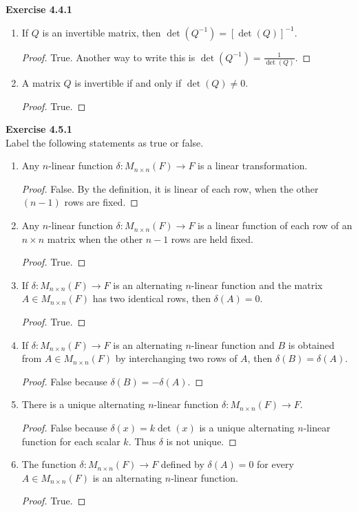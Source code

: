 \documentclass[12pt, a4paper]{article}
\theoremstyle{plain}
\newenvironment{exercise}[2][Exercise]
    { \begin{mdframed}[backgroundcolor=gray!20] \textbf{#1 #2} \\}
    {  \end{mdframed}}
\begin{document}
\begin{exercise}{4.4.1}
\begin{enumerate}[label=(\alph*)]
	\begin{proof}
	True.
	\end{proof}
\item If $Q$ is an invertible matrix, then $\det(Q^{-1})=[\det(Q)]^{-1}$.
	\begin{proof}
	True. Another way to write this is $\det(Q^{-1})=\frac{1}{\det(Q)}$.
	\end{proof}
\item A matrix $Q$ is invertible if and only if $\det(Q)\neq 0$.
	\begin{proof}
	True.
	\end{proof}
\end{enumerate}
\end{exercise}

\begin{exercise}{4.5.1}
Label the following statements as true or false.
	\begin{enumerate}[label=(\alph*)]
	\item Any $n$-linear function $\delta:M_{n\times n}(F)\rightarrow F$ is a linear transformation.
	\begin{proof}
	False. By the definition, it is linear of each row, when the other $(n-1)$ rows are fixed.
	\end{proof}
	
	\item Any $n$-linear function $\delta:M_{n\times n}(F)\rightarrow F$ is a linear function of each row of an $n\times n$ matrix when the other $n-1$ rows are held fixed.
	\begin{proof}
	True.
	\end{proof}
	\item If $\delta:M_{n\times n}(F)\rightarrow F$ is an alternating $n$-linear function and the matrix $A\in M_{n\times n}(F)$ has two identical rows, then $\delta(A)=0$.	
	\begin{proof}
	True.
	\end{proof}
	\item If $\delta:M_{n\times n}(F)\rightarrow F$ is an alternating $n$-linear function and $B$ is obtained from $A\in M_{n\times n}(F)$ by interchanging two rows of $A$, then $\delta(B)=\delta(A)$.
	\begin{proof}
	False because $\delta(B)=-\delta(A)$.
	\end{proof}
	\item There is a unique alternating $n$-linear function $\delta:M_{n\times n}(F)\rightarrow F$.
	\begin{proof}
	False because $\delta(x)=k\det(x)$ is a unique alternating $n$-linear function for each scalar $k$. Thus $\delta$ is not unique.
	\end{proof}
	\item The function $\delta:M_{n\times n}(F)\rightarrow F$ defined by $\delta (A)=0$ for every $A\in M_{n\times n}(F)$ is an alternating $n$-linear function.
	\begin{proof}
	True.
	\end{proof}
	\end{enumerate}
\end{exercise}
\end{document}
